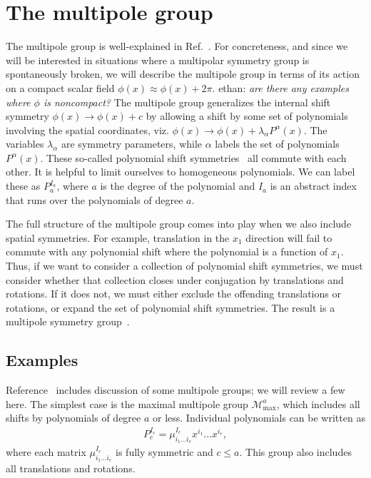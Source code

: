 \documentclass[pra,aps,twocolumn, amsfonts,amsmath,amssymb,nofootinbib,superscriptaddress]{revtex4-2}
\newcommand{\goesto}{\rightarrow}
\newcommand{\ethan}[1]{ { \color{blue} \footnotesize \textsf{ethan: \textsl{#1}} }}
\begin{document}
\section{The multipole group}
\label{multipolegroup}

The multipole group is well-explained in Ref.~\cite{Gromov2019}. For concreteness, and since we will be interested in situations where a multipolar symmetry group is spontaneously broken, we will describe the multipole group in terms of its action on a compact scalar field $\phi(x) \approx \phi(x) + 2\pi$. \ethan{are there any examples where $\phi$ is noncompact?} The multipole group generalizes the internal shift symmetry $\phi(x) \goesto\phi (x) +c$ by allowing a shift by some set of polynomials involving the spatial coordinates, viz. $\phi (x) \goesto \phi (x) + \lambda_\alpha P^\alpha(x)$. The variables $\lambda_\alpha$ are symmetry parameters, while $\alpha$ labels the set of polynomials $P^\alpha(x)$. These so-called polynomial shift symmetries~\cite{Griffin2015} all commute with each other. It is helpful to limit ourselves to homogeneous polynomials. We can label these as $P_a^{I_a}$, where $a$ is the degree of the polynomial and $I_a$ is an abstract index that runs over the polynomials of degree $a$.

The full structure of the multipole group comes into play when we also include spatial symmetries. For example,  translation in the $x_1$ direction will fail to commute with any polynomial shift where the polynomial is a function of $x_1$. Thus, if we want to consider a collection of polynomial shift symmetries, we must consider whether that collection closes under conjugation by translations and rotations. If it does not, we must either exclude the offending translations or rotations, or expand the set of polynomial shift symmetries. The result is a multipole symmetry group~\cite{Gromov2019}.

\subsection{Examples} \label{sub:examples}

Reference~\cite{Gromov2019} includes discussion of some multipole groups; we will review a few here. The simplest case is the maximal multipole group $\mathcal{M}^a_\text{max}$, which includes all shifts by polynomials of degree $a$ or less. Individual polynomials can be written as
\begin{align}
P_c^{I_c} = \mu^{I_c}_{i_1\dots i_c}x^{i_1}\dots x^{i_c}, \label{eqn:basis}
\end{align}
where each  matrix  $\mu^{I_c}_{i_1\dots i_c}$ is fully symmetric and $c\le a$. This group also includes all translations and rotations.
\end{document}
